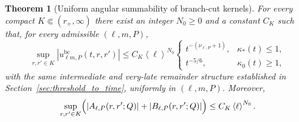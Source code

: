 \documentclass[10pt,a4paper]{amsart}
\newtheorem{theorem}{Theorem}
\newcommand{\abs}[1]{\left|#1\right|}
\newcommand{\angles}[1]{\left\langle #1 \right\rangle}
\newcommand{\bc}{\mathrm{bc}}
\newcommand{\kap}{\kappa}
\begin{document}
\begin{theorem}[Uniform angular summability of branch-cut kernels]\label{thm:uniform_angular}
For every compact $K\Subset(r_+,\infty)$ there exist an integer $N_0\ge0$ and a constant $C_K$ such that, for every admissible $(\ell,m,P)$,
\begin{equation}\label{eq:uniform_angular_kernel_bound}
   \sup_{r,r'\in K}\abs{u_{\ell m,P}^{\bc}(t,r,r')}
   \le
   C_K\angles{\ell}^{N_0}
   \begin{cases}
      t^{-(\nu_{\ell,P}+1)}, & \kap_*(t)\le1,\\[0.5ex]
      t^{-5/6}, & \kap_0(t)\ge1,
   \end{cases}
\end{equation}
with the same intermediate and very-late remainder structure established in Section~\ref{sec:threshold_to_time}, uniformly in $(\ell,m,P)$.  Moreover,
\begin{equation}\label{eq:uniform_angular_amplitudes}
   \sup_{r,r'\in K}
   \Bigl(
      \abs{A_{\ell,P}(r,r';Q)}
      +
      \abs{B_{\ell,P}(r,r';Q)}
   \Bigr)
   \le C_K\angles{\ell}^{N_0}.
\end{equation}
\end{theorem}
\end{document}
